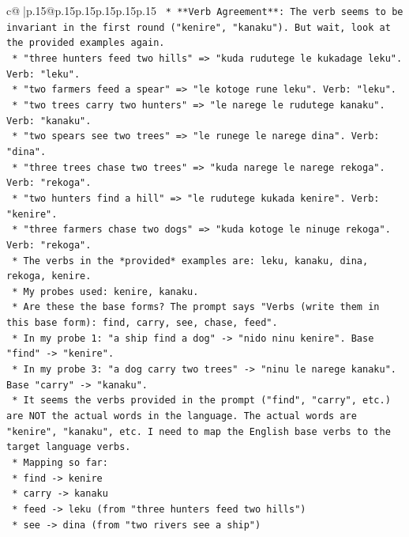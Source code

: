 \documentclass{article}
\begin{document}
{\begin{supertabular}{c@{$\;$}|p{.15\linewidth}@{}p{.15\linewidth}p{.15\linewidth}p{.15\linewidth}p{.15\linewidth}p{.15\linewidth}}
{{{\texttt{    *   **Verb Agreement**: The verb seems to be invariant in the first round ("kenire", "kanaku"). But wait, look at the provided examples again.} \\
\texttt{        *   "three hunters feed two hills" => "kuda rudutege le kukadage leku". Verb: "leku".} \\
\texttt{        *   "two farmers feed a spear" => "le kotoge rune leku". Verb: "leku".} \\
\texttt{        *   "two trees carry two hunters" => "le narege le rudutege kanaku". Verb: "kanaku".} \\
\texttt{        *   "two spears see two trees" => "le runege le narege dina". Verb: "dina".} \\
\texttt{        *   "three trees chase two trees" => "kuda narege le narege rekoga". Verb: "rekoga".} \\
\texttt{        *   "two hunters find a hill" => "le rudutege kukada kenire". Verb: "kenire".} \\
\texttt{        *   "three farmers chase two dogs" => "kuda kotoge le ninuge rekoga". Verb: "rekoga".} \\
\texttt{    *   The verbs in the *provided* examples are: leku, kanaku, dina, rekoga, kenire.} \\
\texttt{    *   My probes used: kenire, kanaku.} \\
\texttt{    *   Are these the base forms? The prompt says "Verbs (write them in this base form): find, carry, see, chase, feed".} \\
\texttt{    *   In my probe 1: "a ship find a dog" {-}> "nido ninu kenire". Base "find" {-}> "kenire".} \\
\texttt{    *   In my probe 3: "a dog carry two trees" {-}> "ninu le narege kanaku". Base "carry" {-}> "kanaku".} \\
\texttt{    *   It seems the verbs provided in the prompt ("find", "carry", etc.) are NOT the actual words in the language. The actual words are "kenire", "kanaku", etc. I need to map the English base verbs to the target language verbs.} \\
\texttt{    *   Mapping so far:} \\
\texttt{        *   find {-}> kenire} \\
\texttt{        *   carry {-}> kanaku} \\
\texttt{        *   feed {-}> leku (from "three hunters feed two hills")} \\
\texttt{        *   see {-}> dina (from "two rivers see a ship")} \\
}}}
\end{supertabular}}
\end{document}
